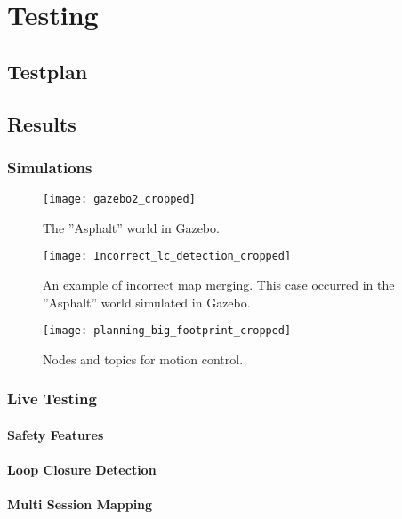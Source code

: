 \chapter{Testing}
\label{chp:testing} 

\section{Testplan}

\section{Results}

\subsection{Simulations}

\begin{figure}[p]
	\centering
	\texttt{[image: gazebo2\_cropped]}
	\caption{The ''Asphalt'' world in Gazebo. }
	\label{fig:Incorrect_lc_detection}
\end{figure}

\begin{figure}[p]
	\centering
	\texttt{[image: Incorrect\_lc\_detection\_cropped]}
	\caption{An example of incorrect map merging. This case occurred in the ''Asphalt'' world simulated in Gazebo.}
	\label{fig:Incorrect_lc_detection}
\end{figure}

\begin{figure}[p]
	\centering
	\texttt{[image: planning\_big\_footprint\_cropped]}
	\caption{Nodes and topics for motion control. }
	\label{fig:big_footprint}
\end{figure}

\subsection{Live Testing}

\subsubsection{Safety Features}

\subsubsection{Loop Closure Detection}

\subsubsection{Multi Session Mapping}


